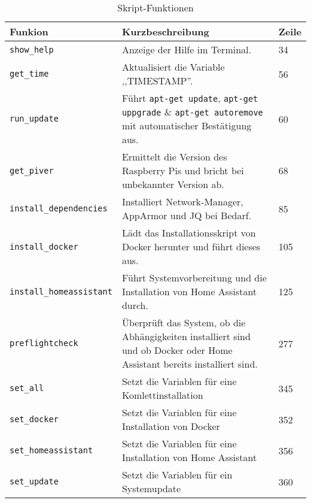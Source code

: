 \begin{table}[H]
\begin{tabularx}{\textwidth}{|p{4.7cm}|p{8cm}|p{1.5cm}|}
 	\hline 
 	\textbf{Funkion} & \textbf{Kurzbeschreibung} & \textbf{Zeile} \\ 
 	\hline 
 	\hline
 	\texttt{show\_help} & Anzeige der Hilfe im Terminal. & 34 \\ 
 	\hline 
 	\texttt{get\_time} & Aktualisiert die Variable ,,TIMESTAMP''. & 56 \\ 
 	\hline
 	\texttt{run\_update} & Führt \texttt{apt-get update}, \texttt{apt-get uppgrade} \& \texttt{apt-get autoremove} mit automatischer Bestätigung aus. & 60 \\ 
 	\hline
 	\texttt{get\_piver} & Ermittelt die Version des Raspberry Pis und bricht bei unbekannter Version ab. & 68 \\
 	\hline
 	\texttt{install\_dependencies} & Installiert Network-Manager, AppArmor und JQ bei Bedarf. & 85 \\ 
 	\hline 
 	\texttt{install\_docker} & Lädt das Installationsskript von Docker herunter und führt dieses aus. & 105 \\ 
 	\hline
 	\texttt{install\_homeassistant} & Führt Systemvorbereitung und die Installation von Home Assistant durch. & 125 \\
 	\hline
 	\texttt{preflightcheck} & Überprüft das System, ob die Abhängigkeiten installiert sind und ob Docker oder Home Assistant bereits installiert sind. & 277 \\ 
 	\hline
 	\texttt{set\_all} & Setzt die Variablen für eine Komlettinstallation & 345 \\ 
 	\hline
 	\texttt{set\_docker} & Setzt die Variablen für eine Installation von Docker & 352 \\ 
 	\hline
 	\texttt{set\_homeassistant} & Setzt die Variablen für eine Installation von Home Assistant & 356 \\
 	\hline
 	\texttt{set\_update} & Setzt die Variablen für ein Systemupdate & 360\\
 	\hline
\end{tabularx} 
    \caption[Skript-Funktionen]{Skript-Funktionen}
    \label{tab:Skript-Funktionen}
\end{table}